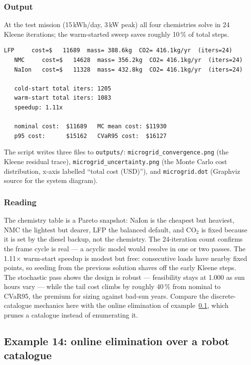 \documentclass[11pt,a4paper]{article}
\begin{document}
\subsubsection*{Output}

At the test mission (15\,kWh/day, 3\,kW peak) all four chemistries
solve in 24 Kleene iterations; the warm-started sweep saves roughly
10\,\% of total steps.

\begin{lstlisting}[language={},numbers=none,keywordstyle={}]
   LFP     cost=$   11689  mass= 388.6kg  CO2= 416.1kg/yr  (iters=24)
   NMC     cost=$   14628  mass= 356.2kg  CO2= 416.1kg/yr  (iters=24)
   NaIon   cost=$   11328  mass= 432.8kg  CO2= 416.1kg/yr  (iters=24)

   cold-start total iters: 1205
   warm-start total iters: 1083
   speedup: 1.11x

   nominal cost:  $11689   MC mean cost: $11930
   p95 cost:      $15162   CVaR95 cost:  $16127
\end{lstlisting}

The script writes three files to \texttt{outputs/}:
\texttt{microgrid\_convergence.png} (the Kleene residual trace),
\texttt{microgrid\_uncertainty.png} (the Monte Carlo cost distribution,
x-axis labelled ``total cost (USD)''), and \texttt{microgrid.dot}
(Graphviz source for the system diagram).

\subsubsection*{Reading}

The chemistry table is a Pareto snapshot: NaIon is the cheapest but
heaviest, NMC the lightest but dearer, LFP the balanced default, and
CO$_2$ is fixed because it is set by the diesel backup, not the
chemistry. The 24-iteration count confirms the frame cycle is real ---
a acyclic model would resolve in one or two passes. The 1.11$\times$
warm-start speedup is modest but free: consecutive loads have nearby
fixed points, so seeding from the previous solution shaves off the
early Kleene steps. The stochastic pass shows the design is robust ---
feasibility stays at 1.000 as sun hours vary --- while the tail cost
climbs by roughly 40\,\% from nominal to CVaR95, the premium for
sizing against bad-sun years. Compare the discrete-catalogue mechanics
here with the online elimination of example~\ref{ex:14}, which prunes a
catalogue instead of enumerating it.

\subsection{Example 14: online elimination over a robot catalogue}
\label{ex:14}
\end{document}
